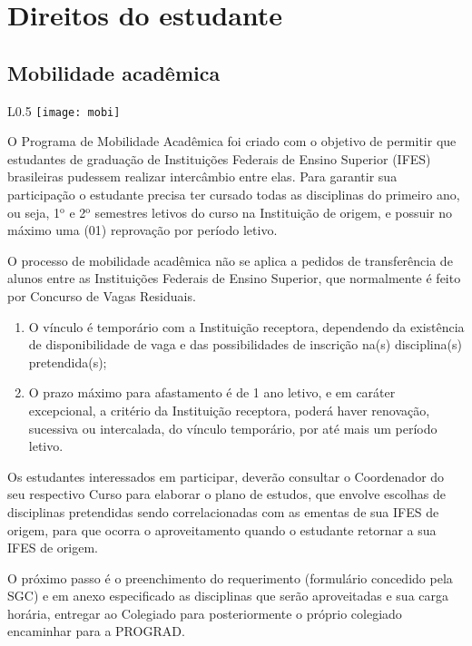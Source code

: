 \chapter{Direitos do estudante}
\DoPToC
\section{Mobilidade acadêmica}

    \begin{wrapfigure}{L}{0.5\textwidth}
        \centering
        \texttt{[image: mobi]}
    \end{wrapfigure}

 O Programa de Mobilidade Acadêmica foi criado com o objetivo de permitir que estudantes de graduação de Instituições Federais de Ensino Superior (IFES)  brasileiras pudessem realizar intercâmbio entre elas. Para garantir sua participação o estudante precisa ter cursado todas as disciplinas do primeiro ano, ou seja, 1$^{\mbox{o}}$ e 2$^{\mbox{o}}$ semestres letivos do curso na Instituição de origem, e possuir no máximo uma (01) reprovação por período letivo.

O processo de mobilidade acadêmica não se aplica a pedidos de transferência de alunos entre as Instituições Federais de Ensino Superior, que normalmente é feito por Concurso de Vagas Residuais.
    \begin{enumerate}
        \item O vínculo é temporário com a Instituição receptora, dependendo da existência de disponibilidade de vaga e das possibilidades de inscrição na(s) disciplina(s) pretendida(s);
        \item O prazo máximo para afastamento é de 1 ano letivo, e em caráter excepcional, a critério da Instituição receptora, poderá haver renovação, sucessiva ou intercalada, do vínculo temporário, por até mais um período letivo.
    \end{enumerate}

Os estudantes interessados em participar, deverão consultar o Coordenador do seu respectivo Curso para elaborar o plano de estudos, que envolve escolhas de disciplinas pretendidas sendo correlacionadas com as ementas de sua IFES de origem, para que ocorra o aproveitamento quando o estudante retornar a sua IFES de origem.
   
O próximo passo é o preenchimento do requerimento (formulário concedido pela SGC) e em anexo especificado as disciplinas que serão aproveitadas e sua carga horária, entregar ao Colegiado para posteriormente o próprio colegiado encaminhar para a PROGRAD.

